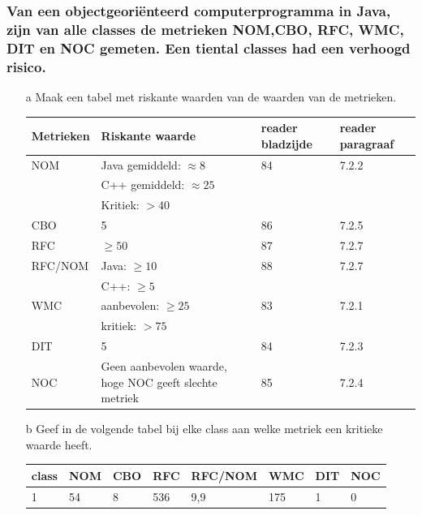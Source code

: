 \documentclass[a4paper,titlepage]{artikel1}
\begin{document}
   \subsubsection[Opdracht 1]{Van een objectgeori\"{e}nteerd computerprogramma in Java, zijn van alle classes de metrieken NOM,CBO, RFC, WMC, DIT en NOC gemeten. Een tiental classes had een verhoogd risico.}
   \begin{itemize}
     \item[a] Maak een tabel met riskante waarden van de waarden van de metrieken.
       \begin{center}
         \begin{tabular}{|l|p{5cm}|l|l|}
           \hline
           Metrieken & Riskante waarde & reader bladzijde & reader paragraaf\\
           \hline
           NOM & Java gemiddeld: $\approx8$ & 84 & 7.2.2 \\
           & C++ gemiddeld: $\approx25$ & & \\
           & Kritiek: $>40$ & & \\
           \hline
           CBO & 5 & 86 & 7.2.5 \\
           \hline
           RFC & $\geq50$ & 87 & 7.2.7 \\
           \hline 
           RFC/NOM & Java: $\geq10$ & 88 & 7.2.7 \\
           & C++: $\geq5$ & & \\
           \hline
           WMC & aanbevolen: $\geq25$ & 83 & 7.2.1 \\
           & kritiek: $>75$ & & \\
           \hline
           DIT & 5 & 84  & 7.2.3 \\
           \hline
           NOC & Geen aanbevolen waarde, hoge NOC geeft slechte metriek & 85  & 7.2.4  \\
           \hline
         \end{tabular}
       \end{center}
     \item[b] Geef in de volgende tabel bij elke class aan welke metriek een kritieke waarde heeft. \\
       \begin{center}
       \begin{tabular}{|l|l|l|l|l|l|l|l|}
         \hline
         class & NOM & CBO & RFC & RFC/NOM & WMC & DIT & NOC \\
         \hline
         1 & 54 & 8 & 536 & 9,9 & 175 & 1 & 0 \\

\end{tabular}
\end{center}
\end{itemize}
\end{document}
